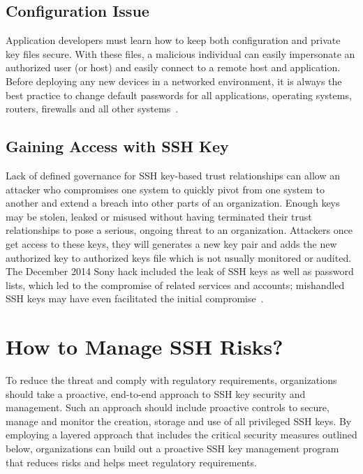 \subsection{Configuration Issue}
Application developers must learn how to keep both configuration
and private key files secure. With these files, a malicious 
individual can easily impersonate an authorized
user (or host) and easily connect to a remote host and application.
Before deploying any new devices in a networked environment,
it is always the best practice to change default passwords
for all applications, operating systems, routers, firewalls
and all other systems~\cite{hid-sp18-513-sans}.

\subsection{Gaining Access with SSH Key}
Lack of defined governance for SSH key-based trust 
relationships can allow an attacker who compromises one 
system to quickly pivot from one system to another and extend
a breach into other parts of an organization. Enough keys may be 
stolen, leaked or misused without having terminated their trust
relationships to pose a serious, ongoing threat to an organization.
Attackers once get access to these keys, they will generates a new 
key pair and adds the new authorized key to authorized keys file
which is not usually monitored or audited.
The December 2014 Sony hack included the leak of SSH keys as well
as password lists, which led to the compromise of related services and
accounts; mishandled SSH keys may have even facilitated the initial 
compromise~\cite{hid-sp18-513-sans}.

\section{How to Manage SSH Risks?}
To reduce the threat and comply with regulatory requirements, 
organizations should take a proactive, end-to-end approach to SSH key
security and management. Such an approach should include proactive
controls to secure, manage and monitor the creation, storage and use
of all privileged SSH keys. By employing a layered approach that includes
the critical security measures outlined below, organizations can build
out a proactive SSH key management program that reduces risks and helps 
meet regulatory requirements.

